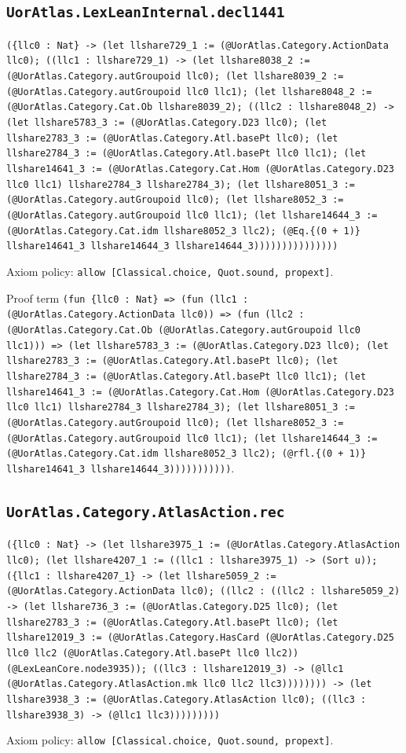 \documentclass[11pt]{article}
\begin{document}
\subsection*{\texttt{UorAtlas.LexLeanInternal.decl1441}}
\noindent\texttt{(\{llc0 : Nat\} -> (let llshare729\_1 := (@UorAtlas.Category.ActionData llc0); ((llc1 : llshare729\_1) -> (let llshare8038\_2 := (@UorAtlas.Category.autGroupoid llc0); (let llshare8039\_2 := (@UorAtlas.Category.autGroupoid llc0 llc1); (let llshare8048\_2 := (@UorAtlas.Category.Cat.Ob llshare8039\_2); ((llc2 : llshare8048\_2) -> (let llshare5783\_3 := (@UorAtlas.Category.D23 llc0); (let llshare2783\_3 := (@UorAtlas.Category.Atl.basePt llc0); (let llshare2784\_3 := (@UorAtlas.Category.Atl.basePt llc0 llc1); (let llshare14641\_3 := (@UorAtlas.Category.Cat.Hom (@UorAtlas.Category.D23 llc0 llc1) llshare2784\_3 llshare2784\_3); (let llshare8051\_3 := (@UorAtlas.Category.autGroupoid llc0); (let llshare8052\_3 := (@UorAtlas.Category.autGroupoid llc0 llc1); (let llshare14644\_3 := (@UorAtlas.Category.Cat.idm llshare8052\_3 llc2); (@Eq.\{(0 + 1)\} llshare14641\_3 llshare14644\_3 llshare14644\_3)))))))))))))))}\par
\noindent Axiom policy: \texttt{allow [Classical.choice, Quot.sound, propext]}.\par
\noindent Proof term \texttt{(fun \{llc0 : Nat\} => (fun (llc1 : (@UorAtlas.Category.ActionData llc0)) => (fun (llc2 : (@UorAtlas.Category.Cat.Ob (@UorAtlas.Category.autGroupoid llc0 llc1))) => (let llshare5783\_3 := (@UorAtlas.Category.D23 llc0); (let llshare2783\_3 := (@UorAtlas.Category.Atl.basePt llc0); (let llshare2784\_3 := (@UorAtlas.Category.Atl.basePt llc0 llc1); (let llshare14641\_3 := (@UorAtlas.Category.Cat.Hom (@UorAtlas.Category.D23 llc0 llc1) llshare2784\_3 llshare2784\_3); (let llshare8051\_3 := (@UorAtlas.Category.autGroupoid llc0); (let llshare8052\_3 := (@UorAtlas.Category.autGroupoid llc0 llc1); (let llshare14644\_3 := (@UorAtlas.Category.Cat.idm llshare8052\_3 llc2); (@rfl.\{(0 + 1)\} llshare14641\_3 llshare14644\_3)))))))))))}.\par
\subsection*{\texttt{UorAtlas.Category.AtlasAction.rec}}
\noindent\texttt{(\{llc0 : Nat\} -> (let llshare3975\_1 := (@UorAtlas.Category.AtlasAction llc0); (let llshare4207\_1 := ((llc1 : llshare3975\_1) -> (Sort u)); (\{llc1 : llshare4207\_1\} -> (let llshare5059\_2 := (@UorAtlas.Category.ActionData llc0); ((llc2 : ((llc2 : llshare5059\_2) -> (let llshare736\_3 := (@UorAtlas.Category.D25 llc0); (let llshare2783\_3 := (@UorAtlas.Category.Atl.basePt llc0); (let llshare12019\_3 := (@UorAtlas.Category.HasCard (@UorAtlas.Category.D25 llc0 llc2 (@UorAtlas.Category.Atl.basePt llc0 llc2)) (@LexLeanCore.node3935)); ((llc3 : llshare12019\_3) -> (@llc1 (@UorAtlas.Category.AtlasAction.mk llc0 llc2 llc3)))))))) -> (let llshare3938\_3 := (@UorAtlas.Category.AtlasAction llc0); ((llc3 : llshare3938\_3) -> (@llc1 llc3)))))))))}\par
\noindent Axiom policy: \texttt{allow [Classical.choice, Quot.sound, propext]}.\par
\end{document}

